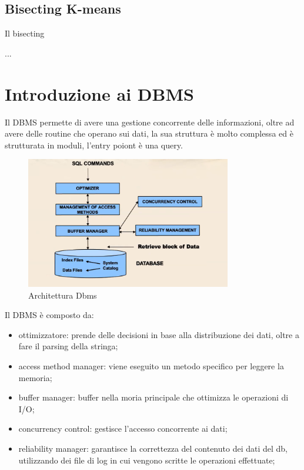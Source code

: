 \documentclass[12pt]{article}
\begin{document}
\subsection{Bisecting K-means}
Il bisecting

...




\section{Introduzione ai DBMS}
Il DBMS permette di avere una gestione concorrente delle informazioni, oltre ad avere delle routine che operano sui dati, la sua struttura \`e molto complessa ed \`e strutturata in moduli, l'entry poiont \`e una query.
\begin{figure}[H]
    \centering
    \includegraphics[width=0.8\textwidth]{architettura-dbms.png}
    \caption{Architettura Dbms}
    \label{fig:architettura-dbms}
\end{figure}
Il DBMS \`e composto da:
\begin{itemize}
    \item ottimizzatore: prende delle decisioni in base alla distribuzione dei dati, oltre a fare il parsing della stringa;
    \item access method manager: viene eseguito un metodo specifico per leggere la memoria;
    \item buffer manager: buffer nella moria principale che ottimizza le operazioni di I/O;
    \item concurrency control: gestisce l'accesso concorrente ai dati;
    \item reliability manager: garantisce la correttezza del contenuto dei dati del db, utilizzando dei file di log in cui vengono scritte le operazioni effettuate;
\end{itemize}
\end{document}
